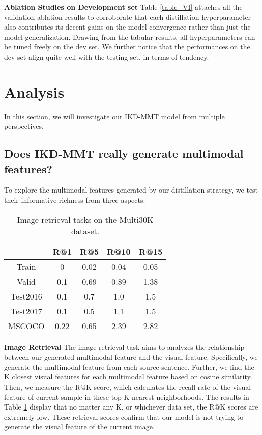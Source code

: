 \documentclass[11pt]{article}
\begin{document}
\textbf{Ablation Studies on Development set}
Table \ref{table_VI} attaches all the validation ablation results to corroborate that each distillation hyperparameter also contributes its decent gains on the model convergence rather than just the model generalization.
Drawing from the tabular results, all hyperparameters can be tuned freely on the dev set. We further notice that the performances on the dev set align quite well with the testing set, in terms of tendency.

\section{Analysis}
In this section, we will investigate our IKD-MMT model from multiple perspectives.

\subsection{Does IKD-MMT really generate multimodal features?}
To explore the multimodal features generated by our distillation strategy, we test their informative richness from three aspects:

\begin{table}[!t]
\centering
\caption{Image retrieval tasks on the Multi30K dataset.}
\label{table_III}
\centering
\renewcommand{\arraystretch}{0.6} {\begin{tabular}{c|cccc}
\hline
\hline
& R@1 & R@5 & R@10 & R@15 \\
\hline
Train & 0 & 0.02 & 0.04 & 0.05 \\
Valid & 0.1 & 0.69 & 0.89 & 1.38 \\
Test2016 & 0.1 & 0.7 & 1.0 & 1.5 \\
Test2017 & 0.1 & 0.5 & 1.1 & 1.5 \\
MSCOCO & 0.22 & 0.65 & 2.39 & 2.82 \\
\hline
\hline
\end{tabular}}
\end{table}

\textbf{Image Retrieval}
The image retrieval task aims to analyzes the relationship between our generated multimodal feature and the visual feature.
Specifically, we generate the multimodal feature from each source sentence.
Further, we find the K closest visual features for each multimodal feature based on cosine similarity.
Then, we measure the R@K score, which calculates the recall rate of the visual feature of current sample in these top K nearest neighborhoods.
The results in Table \ref{table_III} display that no matter any K, or whichever data set, the R@K scores are extremely low.
These retrieval scores confirm that our model is not trying to generate the visual feature of the current image.
\end{document}
